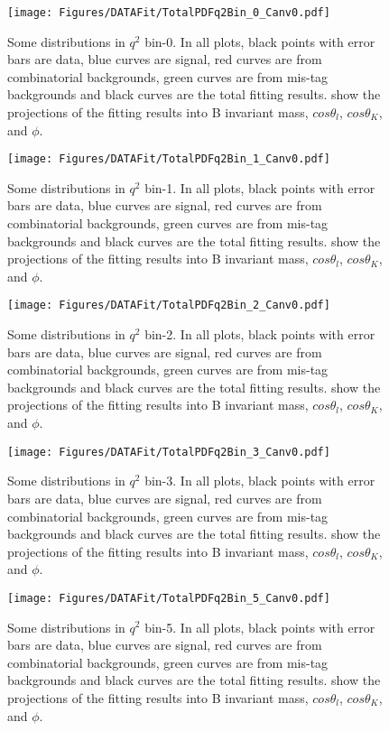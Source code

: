 \begin{figure}
  \centering
  \texttt{[image: Figures/DATAFit/TotalPDFq2Bin\_0\_Canv0.pdf]}
  \caption{Some distributions in $q^2$ bin-0.
    In all plots, black points with error bars are data, blue curves are signal, red curves are from combinatorial backgrounds, green curves are from mis-tag backgrounds and black curves are the total fitting results.
    show the projections of the fitting results into B invariant mass, $cos\theta_l$, $cos\theta_K$, and $\phi$.}
  \label{fig:res_bin0}
\end{figure}

\begin{figure}
  \centering
  \texttt{[image: Figures/DATAFit/TotalPDFq2Bin\_1\_Canv0.pdf]}
  \caption{Some distributions in $q^2$ bin-1.
    In all plots, black points with error bars are data, blue curves are signal, red curves are from combinatorial backgrounds, green curves are from mis-tag backgrounds and black curves are the total fitting results.
    show the projections of the fitting results into B invariant mass, $cos\theta_l$, $cos\theta_K$, and $\phi$.}
  \label{fig:res_bin1}
\end{figure}


\begin{figure}
  \centering
  \texttt{[image: Figures/DATAFit/TotalPDFq2Bin\_2\_Canv0.pdf]}
  \caption{Some distributions in $q^2$ bin-2.
    In all plots, black points with error bars are data, blue curves are signal, red curves are from combinatorial backgrounds, green curves are from mis-tag backgrounds and black curves are the total fitting results.
    show the projections of the fitting results into B invariant mass, $cos\theta_l$, $cos\theta_K$, and $\phi$.}
  \label{fig:res_bin2}
\end{figure}

\begin{figure}
  \centering
  \texttt{[image: Figures/DATAFit/TotalPDFq2Bin\_3\_Canv0.pdf]}
  \caption{Some distributions in $q^2$ bin-3.
    In all plots, black points with error bars are data, blue curves are signal, red curves are from combinatorial backgrounds, green curves are from mis-tag backgrounds and black curves are the total fitting results.
    show the projections of the fitting results into B invariant mass, $cos\theta_l$, $cos\theta_K$, and $\phi$.}
  \label{fig:res_bin3}
\end{figure}

\begin{figure}[!hbtp]
  \centering
  \texttt{[image: Figures/DATAFit/TotalPDFq2Bin\_5\_Canv0.pdf]}
  \caption{Some distributions in $q^2$ bin-5.
    In all plots, black points with error bars are data, blue curves are signal, red curves are from combinatorial backgrounds, green curves are from mis-tag backgrounds and black curves are the total fitting results.
    show the projections of the fitting results into B invariant mass, $cos\theta_l$, $cos\theta_K$, and $\phi$. }
  \label{fig:res_bin5}
\end{figure}

